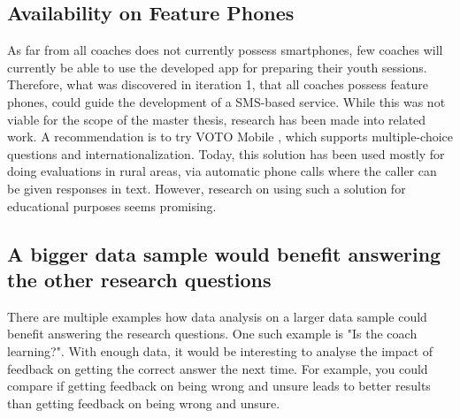 \subsection{Availability on Feature Phones}
As far from all coaches does not currently possess smartphones, few coaches will currently be able to use the developed app for preparing their youth sessions. Therefore, what was discovered in iteration 1, that all coaches possess feature phones, could guide the development of a SMS-based service. While this was not viable for the scope of the master thesis, research has been made into related work. A recommendation is to try VOTO Mobile \citep{voto-mobile}, which supports multiple-choice questions and internationalization. Today, this solution has been used mostly for doing evaluations in rural areas, via automatic phone calls where the caller can be given responses in text. However, research on using such a solution for educational purposes seems promising.

\subsection{A bigger data sample would benefit answering the other research questions}
There are multiple examples how data analysis on a larger data sample could benefit answering the research questions. One such example is "Is the coach learning?". With enough data, it would be interesting to analyse the impact of feedback on getting the correct answer the next time. For example, you could compare if getting feedback on being wrong and unsure leads to better results than getting feedback on being wrong and unsure.
